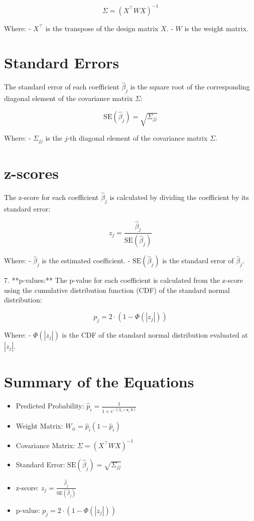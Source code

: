 \documentclass[10pt]{article}
\begin{document}
   \[
   \Sigma = (X^\top W X)^{-1}
   \]

   Where:
   - \( X^\top \) is the transpose of the design matrix \( X \).
   - \( W \) is the weight matrix.

\section*{Standard Errors}
   The standard error of each coefficient \( \hat{\beta}_j \) is the square root of the corresponding diagonal element of the covariance matrix \( \Sigma \):

   \[
   \text{SE}(\hat{\beta}_j) = \sqrt{\Sigma_{jj}}
   \]

   Where:
   - \( \Sigma_{jj} \) is the \( j \)-th diagonal element of the covariance matrix \( \Sigma \).

\section*{z-scores}
   The z-score for each coefficient \( \hat{\beta}_j \) is calculated by dividing the coefficient by its standard error:

   \[
   z_j = \frac{\hat{\beta}_j}{\text{SE}(\hat{\beta}_j)}
   \]

   Where:
   - \( \hat{\beta}_j \) is the estimated coefficient.
   - \( \text{SE}(\hat{\beta}_j) \) is the standard error of \( \hat{\beta}_j \).

7. **p-values:**
   The p-value for each coefficient is calculated from the z-score using the cumulative distribution function (CDF) of the standard normal distribution:

   \[
   p_j = 2 \cdot \left(1 - \Phi\left(\left|z_j\right|\right)\right)
   \]

   Where:
   - \( \Phi(\left|z_j\right|) \) is the CDF of the standard normal distribution evaluated at \( \left|z_j\right| \).

\section*{Summary of the Equations}
\begin{itemize}
  \item Predicted Probability: \( \hat{p}_i = \frac{1}{1 + e^{-(\beta_0 + \mathbf{x}_i^\top \boldsymbol{\beta})}} \)
  \item Weight Matrix: \( W_{ii} = \hat{p}_i (1 - \hat{p}_i) \)
  \item Covariance Matrix: \( \Sigma = (X^\top W X)^{-1} \)
  \item Standard Error: \( \text{SE}(\hat{\beta}_j) = \sqrt{\Sigma_{jj}} \)
  \item z-score: \( z_j = \frac{\hat{\beta}_j}{\text{SE}(\hat{\beta}_j)} \)
  \item p-value: \( p_j = 2 \cdot \left(1 - \Phi\left(\left|z_j\right|\right)\right) \)
\end{itemize}
\end{document}

